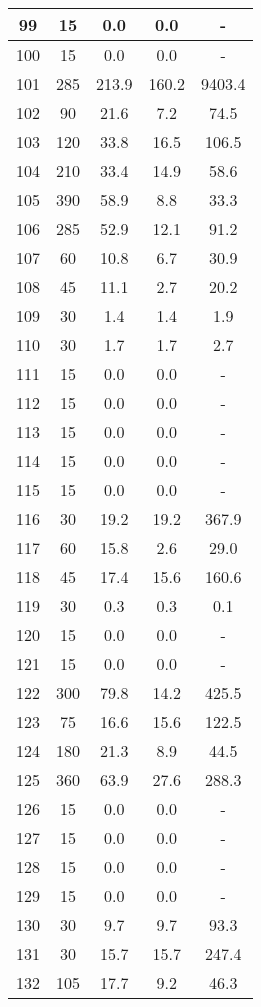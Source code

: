 \documentclass[a4paper,10pt]{article}
\begin{document}
\begin{table}
\begin{tabular}{|c|c|c|c|c|}
\hline
99 & 15 & 0.0 & 0.0 & - \\
\hline
100 & 15 & 0.0 & 0.0 & - \\
\hline
101 & 285 & 213.9 & 160.2 & 9403.4 \\
\hline
102 & 90 & 21.6 & 7.2 & 74.5 \\
\hline
103 & 120 & 33.8 & 16.5 & 106.5 \\
\hline
104 & 210 & 33.4 & 14.9 & 58.6 \\
\hline
105 & 390 & 58.9 & 8.8 & 33.3 \\
\hline
106 & 285 & 52.9 & 12.1 & 91.2 \\
\hline
107 & 60 & 10.8 & 6.7 & 30.9 \\
\hline
108 & 45 & 11.1 & 2.7 & 20.2 \\
\hline
109 & 30 & 1.4 & 1.4 & 1.9 \\
\hline
110 & 30 & 1.7 & 1.7 & 2.7 \\
\hline
111 & 15 & 0.0 & 0.0 & - \\
\hline
112 & 15 & 0.0 & 0.0 & - \\
\hline
113 & 15 & 0.0 & 0.0 & - \\
\hline
114 & 15 & 0.0 & 0.0 & - \\
\hline
115 & 15 & 0.0 & 0.0 & - \\
\hline
116 & 30 & 19.2 & 19.2 & 367.9 \\
\hline
117 & 60 & 15.8 & 2.6 & 29.0 \\
\hline
118 & 45 & 17.4 & 15.6 & 160.6 \\
\hline
119 & 30 & 0.3 & 0.3 & 0.1 \\
\hline
120 & 15 & 0.0 & 0.0 & - \\
\hline
121 & 15 & 0.0 & 0.0 & - \\
\hline
122 & 300 & 79.8 & 14.2 & 425.5 \\
\hline
123 & 75 & 16.6 & 15.6 & 122.5 \\
\hline
124 & 180 & 21.3 & 8.9 & 44.5 \\
\hline
125 & 360 & 63.9 & 27.6 & 288.3 \\
\hline
126 & 15 & 0.0 & 0.0 & - \\
\hline
127 & 15 & 0.0 & 0.0 & - \\
\hline
128 & 15 & 0.0 & 0.0 & - \\
\hline
129 & 15 & 0.0 & 0.0 & - \\
\hline
130 & 30 & 9.7 & 9.7 & 93.3 \\
\hline
131 & 30 & 15.7 & 15.7 & 247.4 \\
\hline
132 & 105 & 17.7 & 9.2 & 46.3 \\

\end{tabular}
\end{table}
\end{document}
